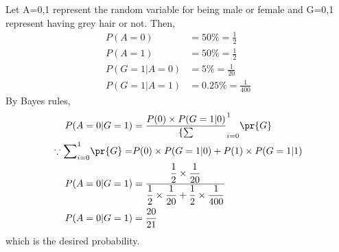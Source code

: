 Let A={0,1} represent the random variable for being male or female and G={0,1} represent having grey hair or not.  Then,\\
  \begin{align}
      P(A=0)&=50\%=\frac{1}{2}\\
      P(A=1)&=50\%=\frac{1}{2}\\
      P(G=1|A=0)&=5\%=\frac{1}{20}\\
      P(G=1|A=1)&=0.25\%=\frac{1}{400}
  \end{align}
  By Bayes rules,\\
  \begin{align}
     P(A=0|G=1)&=\dfrac{P(0)\times P(G=1|0)}{\{\sum}_{i=0}^{1} \pr{G}\\ 
     \because {\sum}_{i=0}^{1}\pr{G}=&P(0)\times P(G=1|0)+P(1)\times P(G=1|1)\\
      P(A=0|G=1)&=\dfrac{\dfrac{1}{2}\times \dfrac{1}{20}}{\dfrac{1}{2} \times \dfrac{1}{20} +\dfrac{1}{2} \times \dfrac{1}{400}}\\
      P(A=0|G=1)&=\dfrac{20}{21}
  \end{align}
  which is the desired probability.